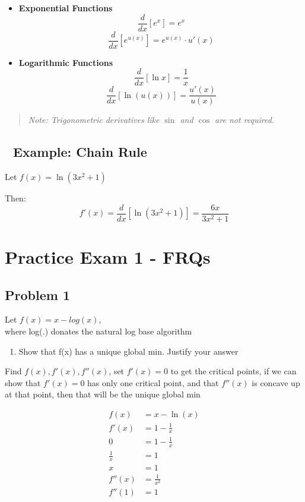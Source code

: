 \documentclass[
  letterpaper,
  DIV=11,
  numbers=noendperiod]{scrartcl}
\providecommand{\tightlist}{%
  \setlength{\itemsep}{0pt}\setlength{\parskip}{0pt}}\usepackage{longtable,booktabs,array}
\begin{document}
\begin{itemize}
\item
  \textbf{Exponential Functions}\\
  \[
  \frac{d}{dx}[e^x] = e^x
  \] \[
  \frac{d}{dx}[e^{u(x)}] = e^{u(x)} \cdot u'(x)
  \]
\item
  \textbf{Logarithmic Functions}\\
  \[
  \frac{d}{dx}[\ln x] = \frac{1}{x}
  \] \[
  \frac{d}{dx}[\ln(u(x))] = \frac{u'(x)}{u(x)}
  \]
\end{itemize}

\begin{quote}
\emph{Note: Trigonometric derivatives like \(\sin\) and \(\cos\) are not
required.}
\end{quote}

\subsection{🧠 Example: Chain Rule}\label{example-chain-rule}

Let \(f(x) = \ln(3x^2 + 1)\)

Then: \[
f'(x) = \frac{d}{dx}[\ln(3x^2 + 1)] = \frac{6x}{3x^2 + 1}
\]

\section{Practice Exam 1 - FRQs}\label{practice-exam-1---frqs}

\subsection{Problem 1}\label{problem-1}

Let \(f(x) = x - log(x)\),\\
where log(.) donates the natural log base algorithm

\begin{enumerate}
\def\labelenumi{\arabic{enumi}.}
\tightlist
\item
  Show that f(x) has a unique global min. Justify your answer
\end{enumerate}

Find \(f(x), f'(x), f''(x)\), set \(f'(x) = 0\) to get the critical
points, if we can show that \(f'(x) = 0\) has only one critical point,
and that \(f''(x)\) is concave up at that point, then that will be the
unique global min

\[
\begin{aligned}
f(x) &= x - \ln(x) \\
f'(x) &= 1 - \frac{1}{x} \\
0 &= 1 - \frac{1}{x} \\
\frac{1}{x} &= 1 \\
x &= 1 \\
f''(x) &= \frac{1}{x^2} \\
f''(1) &= 1
\end{aligned}
\]
\end{document}
